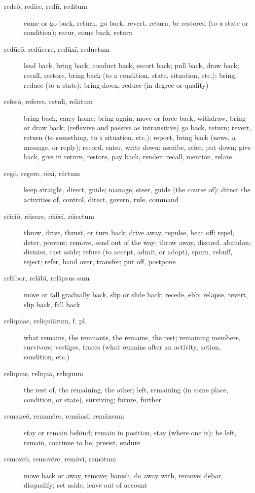 \begin{description}
    \item[redeō, redīre, rediī, reditum] \marginnote{*}come or go back, return, go back; revert, return, be restored (to a state or condition); recur, come back, return
    \item[redūcō, redūcere, redūxī, reductum] lead back, bring back,  conduct back, escort back; pull back, draw back; recall, restore, bring back (to a condition, state, situation, etc.); bring, reduce (to a state); bring down, reduce (in degree or quality)
    \item[referō, referre, retulī, relātum] \marginnote{*}bring back, carry home; bring again; move or force back, withdraw, bring or draw back; (reflexive and passive as intransitive) go back, return; revert, return (to something, to a situation, etc.); report, bring back (news, a message, or reply); record, enter, write down; ascribe, refer, put down; give back, give in return, restore, pay back, render; recall, mention, relate
    \item[regō, regere, rēxī, rēctum] \marginnote{*}keep straight, direct, guide; manage, steer, guide (the course of); direct the activities of, control, direct, govern, rule, command
    \item[rēiciō, rēicere, rēiēcī, rēiectum] throw, drive, thrust, or turn back; drive away, repulse, beat off; repel, deter, prevent; remove, send out of the way; throw away, discard, abandon; dismiss, cast aside; refuse (to accept, admit, or adopt), spurn, rebuff, reject; refer, hand over, transfer; put off, postpone
    \item[relābor, relābī, relāpsus sum] move or fall gradually back, slip or slide back; recede, ebb; relapse, revert, slip back, fall back
    \item[reliquiae, reliquiārum, f. pl.] what remains, the remnants, the remains, the rest; remaining members, survivors; vestiges, traces (what remains after an activity, action, condition, etc.)
    \item[reliquus, reliqua, reliquum] \marginnote{*}the rest of, the remaining, the other; left, remaining (in some place, condition, or state), surviving; future, further
    \item[remaneō, remanēre, remānsī, remānsum] stay or remain behind; remain in position, stay (where one is); be left, remain, continue to be, presist, endure
    \item[removeō, removēre, remōvī, remōtum] \marginnote{*}move back or away, remove; banish, do away with, remove; debar, disqualify; set aside, leave out of account

\end{description}
